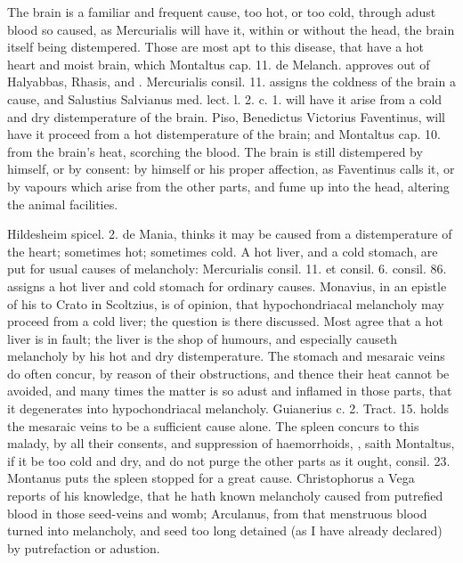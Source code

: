 {{The brain is a familiar and frequent cause, too hot, or too cold,
 through adust blood so caused, as Mercurialis will have it,
within or without the head, the brain itself being distempered. Those
are most apt to this disease, that have a hot heart and moist
brain, which Montaltus cap. 11. de Melanch. approves out of Halyabbas,
Rhasis, and \Avicenna{}. \textlatin{Mercurialis consil. 11.} assigns the coldness of
the brain a cause, and Salustius Salvianus \textlatin{med. lect. l. 2. c. 1.}
will have it arise from a cold and dry distemperature of the
brain. Piso, Benedictus Victorius Faventinus, will have it proceed from
a hot distemperature of the brain; and Montaltus cap. 10.
from the brain's heat, scorching the blood. The brain is still
distempered by himself, or by consent: by himself or his proper
affection, as Faventinus calls it, or by vapours which arise from
the other parts, and fume up into the head, altering the animal
facilities.

\textlatin{Hildesheim spicel. 2. de Mania}, thinks it may be caused from a 
distemperature of the heart; sometimes hot; sometimes cold. A hot
liver, and a cold stomach, are put for usual causes of melancholy:
\textlatin{Mercurialis consil. 11. et consil. 6. consil. 86.} assigns a hot liver
and cold stomach for ordinary causes. Monavius, in an epistle of
his to Crato in Scoltzius, is of opinion, that hypochondriacal
melancholy may proceed from a cold liver; the question is there
discussed. Most agree that a hot liver is in fault; the liver is
the shop of humours, and especially causeth melancholy by his hot and
dry distemperature. The stomach and mesaraic veins do often
concur, by reason of their obstructions, and thence their heat cannot
be avoided, and many times the matter is so adust and inflamed in those
parts, that it degenerates into hypochondriacal melancholy. Guianerius
c. 2. Tract. 15. holds the mesaraic veins to be a sufficient
cause alone. The spleen concurs to this malady, by all their
consents, and suppression of haemorrhoids, , saith Montaltus, if it be too cold and dry, and do
not purge the other parts as it ought, consil. 23. Montanus puts the
 spleen stopped for a great cause. Christophorus a Vega
reports of his knowledge, that he hath known melancholy caused from
putrefied blood in those seed-veins and womb; Arculanus, from
that menstruous blood turned into melancholy, and seed too long
detained (as I have already declared) by putrefaction or adustion.

}}
